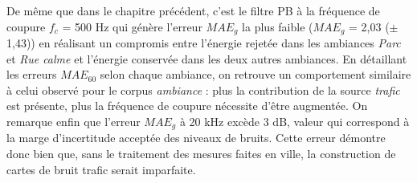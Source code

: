 \begin{table}[h]
\caption{Erreurs moyennes $MAE_{g}$ et $MAE_{60}$ pour l'estimateur \textit{baseline} pour le corpus d'évaluation \textit{SOUR}, en gras-rouge la plus faible erreur $MAE_g$, en gras-noir les erreurs $MAE_{60}$ les plus faibles.}
\label{tab:grafic_baseline}
\centering
{}
\end{table}

De même que dans le chapitre précédent, c'est le filtre PB à la fréquence de coupure $f_c$ = 500 Hz qui génère l'erreur $MAE_g$ la plus faible ($MAE_g$ = 2,03 ($\pm$ 1,43)) en réalisant un compromis entre l'énergie rejetée dans les ambiances \textit{Parc} et \textit{Rue calme} et l'énergie conservée dans les deux autres ambiances. En détaillant les erreurs $MAE_{60}$ selon chaque ambiance, on retrouve un comportement similaire à celui observé pour le corpus \textit{ambiance} : plus la contribution de la source \textit{trafic} est présente, plus la fréquence de coupure nécessite d'être augmentée. 
On remarque enfin que l'erreur $MAE_g$ à 20 kHz excède 3 dB, valeur qui correspond à la marge d'incertitude acceptée des niveaux de bruits. Cette erreur démontre donc bien que, sans le traitement des mesures faites en ville, la construction de cartes de bruit trafic serait imparfaite.

